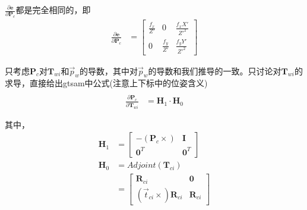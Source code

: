 \documentclass{article}
\begin{document}
$ \frac{\partial{\boldsymbol{e}}}{\partial{\boldsymbol{P}_c}}$都是完全相同的，即
$$
\begin{aligned}
	\frac{\partial{\boldsymbol{e}}}{\partial{\boldsymbol{P}_c}}&=
	\left[ 
	\begin{matrix}
	\frac{f_x}{Z'} & 0              & \frac{f_xX'}{Z'^2} \\
	0              & \frac{f_y}{Z'} & \frac{f_yY'}{Z'^2} 
	\end{matrix}
	\right]
\end{aligned}
$$

只考虑$\boldsymbol{P}_c$对$\boldsymbol{T}_{wi}$和$\vec{p}_w$的导数，其中对$\vec{p}_w$的导数和我们推导的一致。只讨论对$\boldsymbol{T}_{wi}$的求导，直接给出gtsam中公式(注意上下标中的位姿含义)
\begin{equation}
	\begin{aligned}
		\\
		\frac{\partial{\boldsymbol{P}_c}}{\partial{\boldsymbol{T}_{wi}}} & =   \boldsymbol{H}_1\cdot \boldsymbol{H}_0 
		\label{Gtsam_dPc_dTiw}
	\end{aligned}
\end{equation}

其中，
$$
\begin{aligned}
	\boldsymbol{H}_1                         & =                   
	\left[                        
	\begin{matrix}
	-(\boldsymbol{P}_c\times)                & \boldsymbol{I}      \\
	\boldsymbol{0}^T                         & \boldsymbol{0}^T    
	\end{matrix}
	\right]\\
	\boldsymbol{H}_0                         & =                   
	Adjoint(\boldsymbol{T}_{ci}) \\& =                   
	\left[                        
	\begin{matrix}
	\boldsymbol{R}_{ci}                      & \boldsymbol{0}      \\
	(\vec{t}_{ci}\times) \boldsymbol{R}_{ci} & \boldsymbol{R}_{ci} 
	\end{matrix}
	\right]
\end{aligned}
$$
\end{document}
